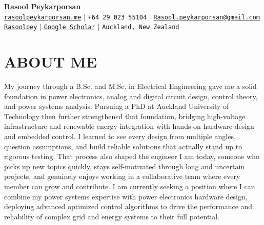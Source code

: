 \documentclass[letterpaper,11pt]{article}
\begin{document}
\begin{center}
    \textbf{\Huge Rasool Peykarporsan} \\ \vspace{5pt}
    \small
    \faGlobe \hspace{2pt} \href{https://rasoolpeykarporsan.me/}{\texttt{rasoolpeykarporsan.me}} \hspace{1pt} $|$
    \hspace{1pt} \faPhone* \hspace{1pt} \texttt{+64 29 023 55104} \hspace{1pt} $|$
    \hspace{1pt} \faEnvelope \hspace{2pt} \href{mailto:Rasool.peykarporsan@gmail.com}{\texttt{Rasool.peykarporsan@gmail.com}} \\
    \faGithub \hspace{2pt} \href{https://github.com/Rasoolpey}{\texttt{Rasoolpey}} \hspace{1pt} $|$
    \hspace{1pt} \faGraduationCap \hspace{2pt} \href{https://scholar.google.com/citations?user=AWOKpCAAAAAJ}{\texttt{Google Scholar}} \hspace{1pt} $|$
    \hspace{1pt} \faMapMarker* \hspace{2pt}\texttt{Auckland, New Zealand}
    \\ \vspace{-3pt}
\end{center}

\section{ABOUT ME}
My journey through a B.Sc. and M.Sc. in Electrical Engineering gave me a solid foundation in power electronics, analog and digital circuit design, control theory, and power systems analysis. 
Pursuing a PhD at Auckland University of Technology then further strengthened that foundation, bridging high-voltage infrastructure and renewable energy integration with hands-on hardware design and embedded control. 
I learned to see every design from multiple angles, question assumptions, and build reliable solutions that actually stand up to rigorous testing. 
That process also shaped the engineer I am today, someone who picks up new topics quickly, stays self-motivated through long and uncertain projects, and genuinely enjoys working in a collaborative team where every member can grow and contribute. 
I am currently seeking a position where I can combine my power systems expertise with power electronics hardware design, deploying advanced optimized control algorithms to drive the performance and reliability of complex grid and energy systems to their full potential.
\end{document}
